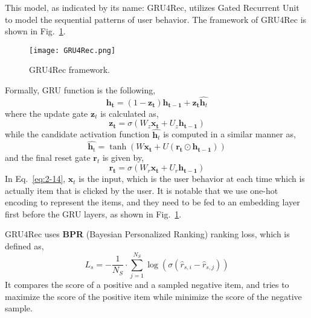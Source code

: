 This model, as indicated by its name: GRU4Rec, utilizes Gated Recurrent Unit to
model the sequential patterns of user behavior. The framework of GRU4Rec is shown
in Fig.~\ref{fig:gru4rec}.
\begin{figure}[h]
	\centering
	\texttt{[image: GRU4Rec.png]}
	\caption{GRU4Rec framework.}
	\label{fig:gru4rec}
	\vspace{-10pt}
\end{figure}
Formally, GRU function is the following, 
\begin{equation}
    \mathbf{h}_{\mathbf{t}}=\left(1-\mathbf{z}_{\mathbf{t}}\right) \mathbf{h}_{\mathbf{t}-\mathbf{1}}+\mathbf{z}_{\mathbf{t}} \hat{\mathbf{h}_{t}}
\end{equation}
where the update gate $\mathbf{z}_t$ is calculated as,
\begin{equation} \label{eq:2-14}
    \mathbf{z}_{\mathbf{t}}=\sigma\left(W_{z} \mathbf{x _ { t }}+U_{z} \mathbf{h}_{\mathbf{t}-\mathbf{1}}\right)
\end{equation}
while the candidate activation function $\hat{\mathbf{h}_t}$ is computed in a similar
manner as, 
\begin{equation}
    \hat{\mathbf{h}_{\mathrm{t}}}=\tanh \left(W \mathbf{x}_{\mathbf{t}}+U\left(\mathbf{r}_{\mathbf{t}} \odot \mathbf{h}_{\mathbf{t}-\mathbf{1}}\right)\right)
\end{equation}
and the final reset gate $\mathbf{r}_t$ is given by,
\begin{equation}
    \mathbf{r}_{\mathbf{t}}=\sigma\left(W_{r} \mathbf{x}_{\mathbf{t}}+U_{r} \mathbf{h}_{\mathbf{t}-\mathbf{1}}\right)
\end{equation}
In Eq.~\ref{eq:2-14}, $\mathbf{x}_t$ is the input, which is the user behavior at
each time which is actually item that is clicked by the user. It is notable that
we use one-hot encoding to represent the items, and they need to be fed to
an embedding layer first before the GRU layers, as shown in Fig.~\ref{fig:gru4rec}.

GRU4Rec uses \textbf{BPR} (Bayesian Personalized Ranking) ranking loss, 
which is defined as,
\begin{equation}
    L_s = -\frac{1}{N_{S}} \cdot \sum_{j=1}^{N_{S}} \log \left(\sigma\left(\hat{r}_{s, i}-\hat{r}_{s, j}\right)\right)
\end{equation}
It compares the score of a positive and a sampled negative item, and tries
to maximize the score of the positive item while minimize the score of the negative
sample.

